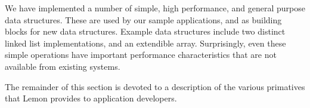 \documentclass[letterpaper,twocolumn,english]{article}
\newcommand{\yad}{Lemon\xspace}
\begin{document}
We have implemented a number of simple, high performance,
and general purpose data structures.  These are used by our sample
applications, and as building blocks for new data structures.  Example
data structures include two distinct linked list implementations, and
an extendible array.  Surprisingly, even these simple operations have
important performance characteristics that are not available from
existing systems.

The remainder of this section is devoted to a description of the
various primatives that \yad provides to application developers.



%
%
%
%
%
%
%
%
\end{document}
